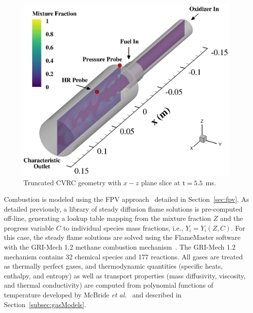 \begin{figure}
	\centering
	\includegraphics[width=0.8\linewidth]{Chapters/HPROMResults/Images/cvrc/geom_hrProbe.png}
    \caption{\label{fig:cvrcGeom}
	Truncated CVRC geometry with $x-z$ plane slice at $\text{t} = 5.5$ ms.}
\end{figure}

Combustion is modeled using the FPV approach~\cite{Pierce2001} detailed in Section~\ref{sec:fpv}. As detailed previously, a library of steady diffusion flame solutions is pre-computed off-line, generating a lookup table mapping from the mixture fraction $Z$ and the progress variable $C$ to individual species mass fractions, i.e., $Y_i = Y_i(Z,C)$. For this case, the steady flame solutions are solved using the FlameMaster software~\cite{flamemaster} with the GRI-Mech 1.2 methane combustion mechanism~\cite{griMech}. The GRI-Mech 1.2 mechanism contains 32 chemical species and 177 reactions. All gases are treated as thermally perfect gases, and thermodynamic quantities (specific heats, enthalpy, and entropy) as well as transport properties (mass diffusivity, viscosity, and thermal conductivity) are computed from polynomial functions of temperature developed by McBride \textit{et al.}~\cite{McBride1993} and described in Section~\ref{subsec:gasModels}.

